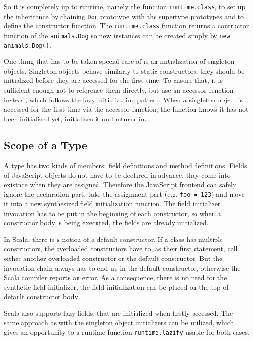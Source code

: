 \documentclass[12pt,a4paper]{report}
\begin{document}
So it is completely up to runtime, namely the function \texttt{runtime.class}, to set up the inheritance by chaining \texttt{Dog} prototype with the supertype prototypes and to define the constructor function. The \texttt{runtime.class} function returns a contructor function of the \texttt{animals.Dog} so new instances can be created simply by \texttt{new animals.Dog()}.

One thing that has to be taken special care of is an initialization of singleton objects. Singleton objects behave similarly to static constructors, they should be initialized before they are accessed for the first time. To ensure that, it is sufficient enough not to reference them directly, but use an accessor function instead, which follows the lazy initialization pattern\cite{Lazy}. When a singleton object is accessed for the first time via the accessor function, the function knows it has not been initialized yet, initializes it and returns in.

\subsection{Scope of a Type}

A type has two kinds of members: field definitions and method definitions. Fields of JavaScript objects do not have to be declared in advance, they come into existnce when they are assigned. Therefore the JavaScript frontend can safely ignore the declaration part, take the assignment part (e.g. \texttt{foo = 123}) and move it into a new synthesized field initialization function. The field initializer invocation has to be put in the beginning of each constructor, so when a constructor body is being executed, the fields are already initialized.

In Scala, there is a notion of a default constructor. If a class has multiple constructors, the overloaded constructors have to, as their first statement, call either another overloaded constructor or the default constructor. But the invocation chain always has to end up in the default constructor, otherwise the Scala compiler reports an error. As a consequence, there is no need for the synthetic field initializer, the field initialization can be placed on the top of default constructor body.

Scala also supports lazy fields, that are initialized when firstly accessed. The same approach as with the singleton object initializers can be utilized, which gives an opportunity to a runtime function \texttt{runtime.lazify} usable for both cases.
\end{document}
